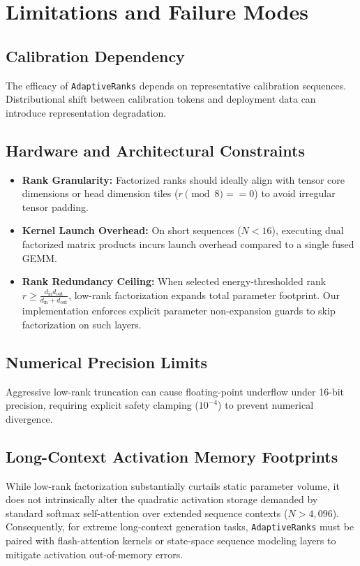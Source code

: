 \section{Limitations and Failure Modes}

\subsection{Calibration Dependency}
The efficacy of \texttt{AdaptiveRanks} depends on representative calibration sequences. Distributional shift between calibration tokens and deployment data can introduce representation degradation.

\subsection{Hardware and Architectural Constraints}
\begin{itemize}
\item \textbf{Rank Granularity:} Factorized ranks should ideally align with tensor core dimensions or head dimension tiles ($r \pmod 8 == 0$) to avoid irregular tensor padding.
\item \textbf{Kernel Launch Overhead:} On short sequences ($N < 16$), executing dual factorized matrix products incurs launch overhead compared to a single fused GEMM.
\item \textbf{Rank Redundancy Ceiling:} When selected energy-thresholded rank $r \ge \frac{d_{\text{in}} d_{\text{out}}}{d_{\text{in}} + d_{\text{out}}}$, low-rank factorization expands total parameter footprint. Our implementation enforces explicit parameter non-expansion guards to skip factorization on such layers.
\end{itemize}

\subsection{Numerical Precision Limits}
Aggressive low-rank truncation can cause floating-point underflow under 16-bit precision, requiring explicit safety clamping ($10^{-4}$) to prevent numerical divergence.

\subsection{Long-Context Activation Memory Footprints}
While low-rank factorization substantially curtails static parameter volume, it does not intrinsically alter the quadratic activation storage demanded by standard softmax self-attention over extended sequence contexts ($N > 4{,}096$). Consequently, for extreme long-context generation tasks, \texttt{AdaptiveRanks} must be paired with flash-attention kernels or state-space sequence modeling layers to mitigate activation out-of-memory errors.

